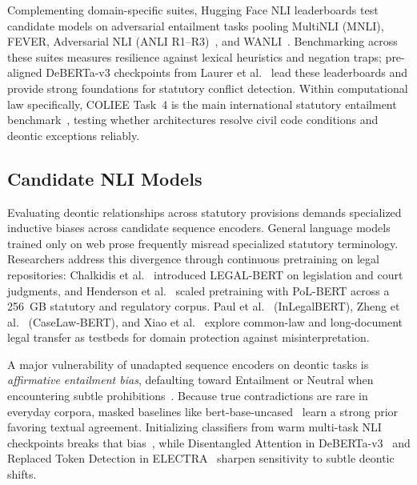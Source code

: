     Complementing domain-specific suites, Hugging Face NLI leaderboards test candidate models on adversarial entailment tasks pooling MultiNLI (MNLI), FEVER, Adversarial NLI (ANLI R1--R3)~\cite{nie2020anli}, and WANLI~\cite{liu2022wanli}. Benchmarking across these suites measures resilience against lexical heuristics and negation traps; pre-aligned DeBERTa-v3 checkpoints from Laurer et al.~\cite{laurer2024less} lead these leaderboards and provide strong foundations for statutory conflict detection. Within computational law specifically, COLIEE Task~4 is the main international statutory entailment benchmark~\cite{rabelo2022coliee, coliee2025proceedings, coliee2026proceedings}, testing whether architectures resolve civil code conditions and deontic exceptions reliably.

    \subsection{Candidate NLI Models}
    \label{sec:nli_candidate_models}
    Evaluating deontic relationships across statutory provisions demands specialized inductive biases across candidate sequence encoders. General language models trained only on web prose frequently misread specialized statutory terminology. Researchers address this divergence through continuous pretraining on legal repositories: Chalkidis et al.~\cite{chalkidis2020legal} introduced LEGAL-BERT on legislation and court judgments, and Henderson et al.~\cite{henderson2022pileoflaw} scaled pretraining with PoL-BERT across a 256~GB statutory and regulatory corpus. Paul et al.~\cite{paul2022inlegalbert} (InLegalBERT), Zheng et al.~\cite{zheng2021when} (CaseLaw-BERT), and Xiao et al.~\cite{xiao2021lawformer} explore common-law and long-document legal transfer as testbeds for domain protection against misinterpretation.

    A major vulnerability of unadapted sequence encoders on deontic tasks is \textit{affirmative entailment bias}, defaulting toward Entailment or Neutral when encountering subtle prohibitions~\cite{alshehri2026cross, tran2026enhancing}. Because true contradictions are rare in everyday corpora, masked baselines like bert-base-uncased~\cite{devlin2019bert} learn a strong prior favoring textual agreement. Initializing classifiers from warm multi-task NLI checkpoints breaks that bias~\cite{laurer2024less}, while Disentangled Attention in DeBERTa-v3~\cite{he2023debertav3} and Replaced Token Detection in ELECTRA~\cite{clark2020electra} sharpen sensitivity to subtle deontic shifts.

